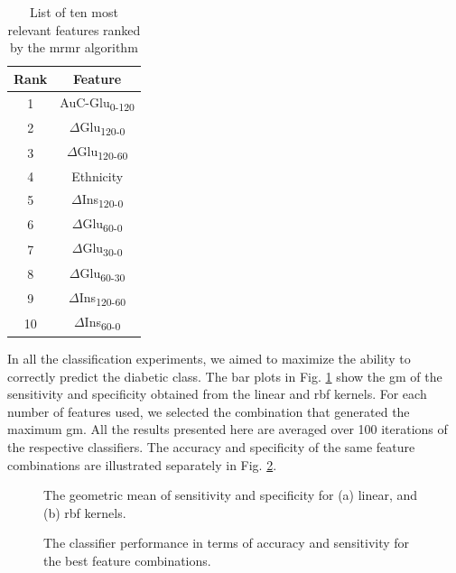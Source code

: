 \documentclass[journal,comsoc]{IEEEtran}
\renewcommand{\^}{\hat}  %
\begin{document}
%
\begin{table}[!b]
  \centering
  \renewcommand{\arraystretch}{1.3}
  \caption{List of ten most relevant features ranked by the \ac{mrmr} algorithm}
  \centering
  \begin{tabular}{c c}
    \toprule
    Rank &  Feature\\
    \midrule \midrule
    1 & AuC-Glu\textsubscript{0-120}\\
    2 & $\Delta$Glu\textsubscript{120-0}\\
    3 & $\Delta$Glu\textsubscript{120-60}\\
    4 & Ethnicity \\
    5 & $\Delta$Ins\textsubscript{120-0}\\
    6 & $\Delta$Glu\textsubscript{60-0}\\
    7 & $\Delta$Glu\textsubscript{30-0}\\
    8 & $\Delta$Glu\textsubscript{60-30}\\
    9 & $\Delta$Ins\textsubscript{120-60}\\
    10 & $\Delta$Ins\textsubscript{60-0}\\
    \bottomrule
  \end{tabular}
  \label{tab:ranked}
\end{table}
%
In all the classification experiments, we aimed to maximize the ability to correctly predict the diabetic class. The bar plots in Fig. \ref{fig:gmean} show the \ac{gm} of the sensitivity and specificity obtained from the linear and \ac{rbf} kernels. For each number of features used, we selected the combination that generated the maximum \ac{gm}. All the results presented here are averaged over \num{100} iterations of the respective classifiers. The accuracy and specificity of the same feature combinations are illustrated separately in Fig. \ref{fig:sn_acc}.
%
\begin{figure}[h!]
	\centering
	\caption{The geometric mean of sensitivity and specificity for (a) linear, and (b) \ac{rbf} kernels.}
	\label{fig:gmean}
\end{figure}
%
\begin{figure}[t!]
	\centering
	\caption{The classifier performance in terms of accuracy and sensitivity for the best feature combinations.}
	\label{fig:sn_acc}
\end{figure}
%
\end{document}
